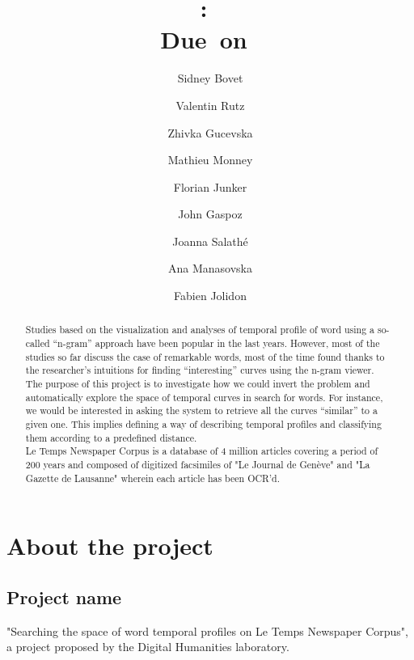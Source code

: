 \documentclass{article}
\title{
\vspace{2in}
\textmd{\textbf{\hmwkClass:\ \hmwkTitle}}\\
\normalsize\vspace{0.1in}\small{Due\ on\ \hmwkDueDate}\\
\vspace{3in}
}
\author{Sidney Bovet \and Valentin Rutz \and Zhivka Gucevska  \and Mathieu Monney\and Florian Junker\and John Gaspoz\and Joanna Salath\'e\and Ana Manasovska\and Fabien Jolidon}
\date{} %
\begin{document}
\maketitle



\newpage
\tableofcontents
\newpage

\begin{abstract}

Studies based on the visualization and analyses of temporal profile of word using a so-called “n-gram” approach have been popular in the last years. However, most of the studies so far discuss the case of remarkable words, most of the time found thanks to the researcher’s intuitions for finding “interesting” curves using the n-gram viewer.\\
The purpose of this project is to investigate how we could invert the problem and automatically explore the space of temporal curves in search for words. For instance, we would be interested in asking the system to retrieve all the curves “similar” to a given one. This implies defining a way of describing temporal profiles and classifying them according to a predefined distance. \\
Le Temps Newspaper Corpus is a database of 4 million articles covering a period of 200 years and composed of digitized facsimiles of "Le Journal de Genève" and "La Gazette de Lausanne" wherein each article has been OCR'd.
\end{abstract}
\newpage

\section{About the project}
\subsection{Project name}
"Searching the space of word temporal profiles on Le Temps Newspaper Corpus", a project proposed by the Digital Humanities laboratory.
\end{document}
